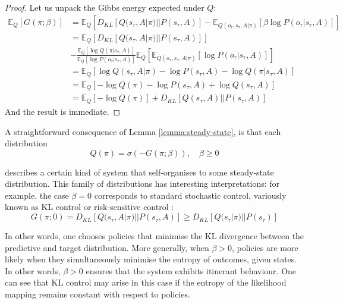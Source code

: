 \documentclass{article}
\begin{document}
\begin{proof}
Let us unpack the Gibbs energy expected under $Q$:
\begin{equation}
    \begin{split}
        \mathbb E_Q[G(\pi; \beta)] &=\mathbb E_Q[D_{KL}[Q(s_\tau, A|\pi)||P(s_\tau,A)]-\mathbb E_{Q(o_\tau, s_\tau, A|\pi)} [\beta \log P(o_\tau |s_\tau, A)]] \\
        &= \mathbb E_Q[D_{KL}[Q(s_\tau, A|\pi)||P(s_\tau,A)]]\\
        &-\frac{\mathbb E_Q[\log Q(\pi|s_\tau,A)]}{\mathbb E_Q[\log P(o_\tau|s_\tau,A)]} \mathbb E_Q [\mathbb E_{Q(o_\tau, s_\tau, A|\pi)} [ \log P(o_\tau |s_\tau, A)]] \\
        &= \mathbb E_Q[\log Q(s_\tau, A|\pi)-\log P(s_\tau, A)-\log Q(\pi |s_\tau,A)] \\
        &= \mathbb E_Q[-\log Q(\pi)-\log P(s_\tau, A)+\log Q(s_\tau,A)] \\
        &= \mathbb E_Q[-\log Q(\pi)] +D_{KL}[Q(s_\tau,A)||P(s_\tau, A)]
    \end{split}
\end{equation}
And the result is immediate.
\end{proof}

A straightforward consequence of Lemma \ref{lemma:steady-state}, is that each distribution
\begin{equation}
    \label{eq:posterior_gibbs}
   Q(\pi) =\sigma(-G(\pi; \beta)),\quad \beta \geq 0
\end{equation}

describes a certain kind of system that self-organises to some steady-state distribution. This family of distributions has interesting interpretations: for example, the case $\beta=0$ corresponds to standard stochastic control, variously known as KL control or risk-sensitive control \cite{vandenbroekRiskSensitivePath2010}: 
\begin{equation}
    G(\pi; 0) = D_{KL}[Q(s_\tau, A|\pi)||P(s_\tau, A)] \geq D_{KL}[Q(s_\tau |\pi)||P(s_\tau)]
\end{equation}

In other words, one chooses policies that minimise the KL divergence between the predictive and target distribution. More generally, when $\beta >0$, policies are more likely when they simultaneously minimise the entropy of outcomes, given states. In other words, $\beta >0$ ensures that the system exhibits itinerant behaviour. One can see that KL control may arise in this case if the entropy of the likelihood mapping remains constant with respect to policies.
\end{document}
